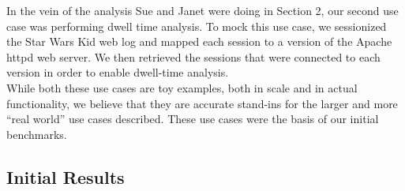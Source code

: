 \documentclass{sig-alternate}
\begin{document}
 In the vein of the analysis Sue and Janet were doing in Section 2, our second use case was performing dwell time analysis.
To mock this use case, we sessionized the Star Wars Kid web log and mapped each session to a version of the Apache httpd web server.
We then retrieved the sessions that were connected to each version in order to enable dwell-time analysis. 
\\

While both these use cases are toy examples, both in scale and in actual functionality, we believe that they are accurate stand-ins for the larger and more ``real world'' use cases described. 
These use cases were the basis of our initial benchmarks.

\subsection{Initial Results}
\end{document}
